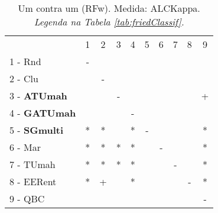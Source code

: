 \begin{table}[h]
\caption{Um contra um (RFw). Medida: ALCKappa. \textit{Legenda na Tabela \ref{tab:friedClassif}.}}
\begin{center}\begin{tabular}{lcc|cc|cc|cc|c}
 			& 1 & 2 & 3 & 4 & 5 & 6 & 7 & 8 & 9\\
1 - Rnd  	& - &   &   &   &   &   &   &   &   \\
2 - Clu  	&   & - &   &   &   &   &   &   &   \\ \hline
3 - \textbf{ATUmah}	&   &   & - &   &   &   &   &   & + \\
4 - \textbf{GATUmah}	&   &   &   & - &   &   &   &   &   \\ \hline
5 - \textbf{SGmulti}	& * & * &   & * & - &   &   &   & * \\
6 - Mar  	& * & * & * & * &   & - &   &   & * \\ \hline
7 - TUmah	& * & * & * & * &   &   & - &   & * \\
8 - EERent	& * & + &   & * &   &   &   & - & * \\ \hline
9 - QBC  	&   &   &   &   &   &   &   &   & - \\\end{tabular}
\label{stratsALCKappaFriedRFwRedux}
\end{center}
\end{table}